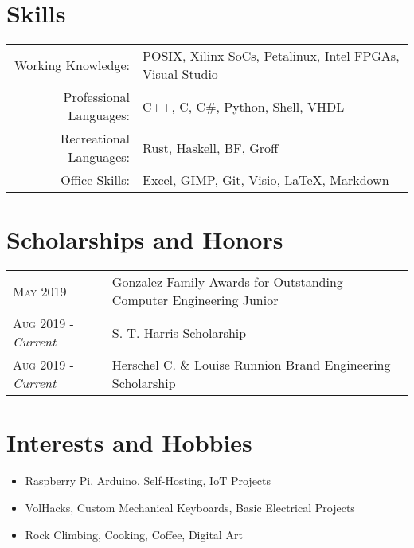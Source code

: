 \documentclass[a4paper,11pt]{article}
\begin{document}
\section{Skills}
\begin{tabularx}{\textwidth}{rl}
   Working Knowledge: & POSIX, Xilinx SoCs, Petalinux, Intel FPGAs, Visual Studio\\
   Professional Languages: & C++, C, C\#, Python, Shell, VHDL\\
   Recreational Languages: & Rust, Haskell, BF, Groff\\
   Office Skills: & Excel, GIMP, Git, Visio, \LaTeX{}, Markdown\\
\end{tabularx}

\section{Scholarships and Honors}
\begin{tabularx}{\textwidth}{lX}
   \textsc{May 2019} & Gonzalez Family Awards for Outstanding Computer Engineering Junior\\
   \textsc{Aug 2019} \-- \emph{Current} & S. T. Harris Scholarship\\
   \textsc{Aug 2019} \-- \emph{Current} & Herschel C. \& Louise Runnion Brand Engineering Scholarship\\
\end{tabularx}

\section{Interests and Hobbies}
\begin{itemize}[topsep=1pt,itemsep=0pt,partopsep=1pt, parsep=1pt]
   \item Raspberry Pi, Arduino, Self-Hosting, IoT Projects
   \item VolHacks, Custom Mechanical Keyboards, Basic Electrical Projects
   \item Rock Climbing, Cooking, Coffee, Digital Art
\end{itemize}
\end{document}
